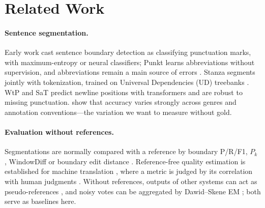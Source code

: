 
\section{Related Work}
\label{sec:related}

\paragraph{Sentence segmentation.} Early work cast sentence boundary detection as classifying punctuation marks, with
maximum-entropy \citep{reynar-ratnaparkhi-1997-maximum} or neural \citep{palmer-hearst-1997-adaptive} classifiers;
Punkt \citep{kiss-strunk-2006-unsupervised} learns abbreviations without supervision, and abbreviations remain a main
source of errors \citep{gillick-2009-sentence}. Stanza \citep{qi-etal-2020-stanza} segments jointly with tokenization,
trained on Universal Dependencies (UD) treebanks \citep{demarneffe-etal-2021-universal}. WtP and SaT
\citep{minixhofer-etal-2023-wheres,frohmann-etal-2024-segment} predict newline positions with transformers and are robust
to missing punctuation. \citet{read-etal-2012-sentence} show that accuracy varies strongly across genres and annotation
conventions---the variation we want to measure without gold.

\paragraph{Evaluation without references.} Segmentations are normally compared with a reference by boundary
P/R/F1, $P_k$ \citep{beeferman-etal-1999-statistical}, WindowDiff \citep{pevzner-hearst-2002-critique} or boundary edit
distance \citep{fournier-2013-evaluating}. Reference-free quality estimation is established for machine translation
\citep{specia-etal-2018-quality,rei-etal-2020-comet}, where a metric is judged by its correlation with human judgments
\citep{freitag-etal-2021-results}. Without references, outputs of other systems can act as pseudo-references
\citep{albrecht-hwa-2007-regression,louis-nenkova-2013-automatically,gao-etal-2020-supert}, and noisy votes can be
aggregated by Dawid--Skene EM \citep{dawid-skene-1979-maximum}; both serve as baselines here.

